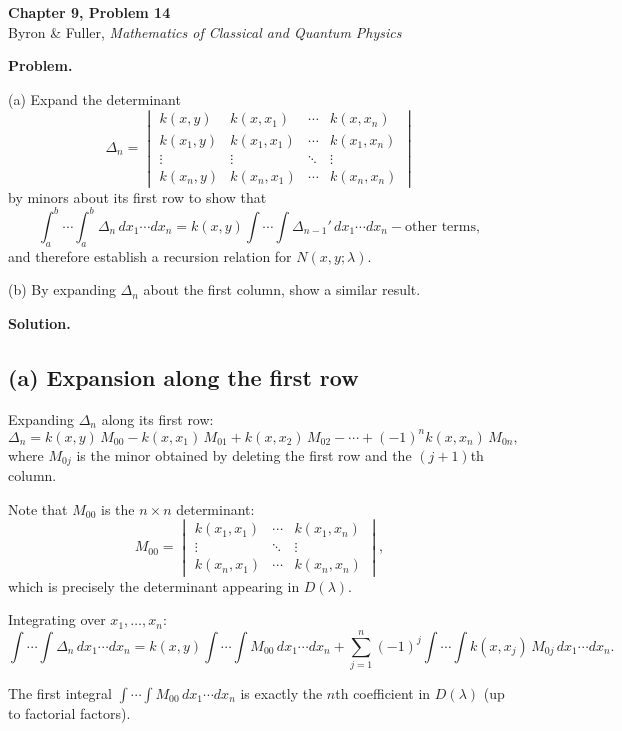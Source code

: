 \documentclass[12pt]{article}
\begin{document}
\begin{center}
{\Large\bfseries Chapter 9, Problem 14}\\[6pt]
Byron \& Fuller, \textit{Mathematics of Classical and Quantum Physics}
\end{center}

\bigskip

\textbf{Problem.}

(a) Expand the determinant
\[
\Delta_n = \begin{vmatrix} k(x,y) & k(x,x_1) & \cdots & k(x,x_n) \\ k(x_1,y) & k(x_1,x_1) & \cdots & k(x_1,x_n) \\ \vdots & \vdots & \ddots & \vdots \\ k(x_n,y) & k(x_n,x_1) & \cdots & k(x_n,x_n) \end{vmatrix}
\]
by minors about its first row to show that
\[
\int_a^b \cdots \int_a^b \Delta_n\,dx_1\cdots dx_n = k(x,y)\int\cdots\int \Delta_{n-1}'\,dx_1\cdots dx_n - \text{other terms},
\]
and therefore establish a recursion relation for $N(x,y;\lambda)$.

(b) By expanding $\Delta_n$ about the first column, show a similar result.

\bigskip
\textbf{Solution.}

\subsection*{(a) Expansion along the first row}

Expanding $\Delta_n$ along its first row:
\[
\Delta_n = k(x,y)\,M_{00} - k(x,x_1)\,M_{01} + k(x,x_2)\,M_{02} - \cdots + (-1)^n k(x,x_n)\,M_{0n},
\]
where $M_{0j}$ is the minor obtained by deleting the first row and the $(j+1)$th column.

Note that $M_{00}$ is the $n \times n$ determinant:
\[
M_{00} = \begin{vmatrix} k(x_1,x_1) & \cdots & k(x_1,x_n) \\ \vdots & \ddots & \vdots \\ k(x_n,x_1) & \cdots & k(x_n,x_n) \end{vmatrix},
\]
which is precisely the determinant appearing in $D(\lambda)$.

Integrating over $x_1, \ldots, x_n$:
\[
\int \cdots \int \Delta_n\,dx_1\cdots dx_n = k(x,y)\int\cdots\int M_{00}\,dx_1\cdots dx_n + \sum_{j=1}^n (-1)^j \int\cdots\int k(x,x_j)\,M_{0j}\,dx_1\cdots dx_n.
\]

The first integral $\int\cdots\int M_{00}\,dx_1\cdots dx_n$ is exactly the $n$th coefficient in $D(\lambda)$ (up to factorial factors).
\end{document}
